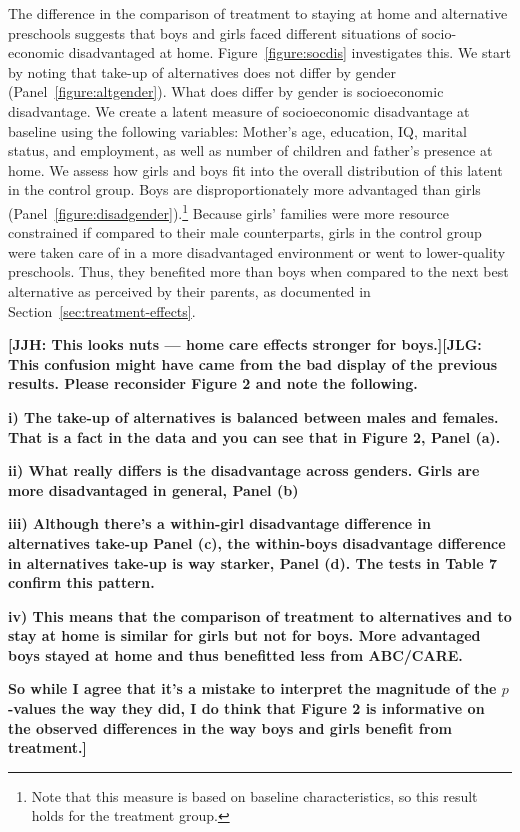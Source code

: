 The difference in the comparison of treatment to staying at home and alternative preschools suggests that boys and girls faced different situations of socio-economic disadvantaged at home. Figure~\ref{figure:socdis} investigates this. We start by noting that take-up of alternatives does not differ by gender (Panel~\ref{figure:altgender}). What does differ by gender is socioeconomic disadvantage. We create a latent measure of socioeconomic disadvantage at baseline using the following variables: Mother's age, education, IQ, marital status, and employment, as well as number of children and father's presence at home. We assess how girls and boys fit into the overall distribution of this latent in the control group. Boys are disproportionately more advantaged than girls (Panel~\ref{figure:disadgender}).\footnote{Note that this measure is based on baseline characteristics, so this result holds for the treatment group.} Because girls' families were more resource constrained if compared to their male counterparts, girls in the control group were taken care of in a more disadvantaged environment or went to lower-quality preschools. Thus, they benefited more than boys when compared to the next best alternative as perceived by their parents, as documented in Section~\ref{sec:treatment-effects}.

 \textbf{[JJH: This looks nuts --- home care effects stronger for boys.][JLG: This confusion might have came from the bad display of the previous results. Please reconsider Figure 2 and note the following.}

 \textbf{i) The take-up of alternatives is balanced between males and females. That is a fact in the data and you can see that in Figure 2, Panel (a).}

 \textbf{ii) What really differs is the disadvantage across genders. Girls are more disadvantaged in general, Panel (b)}

 \textbf{iii) Although there's a within-girl disadvantage difference in alternatives take-up Panel (c), the within-boys disadvantage difference in alternatives take-up is way starker, Panel (d). The tests in Table 7 confirm this pattern.}

 \textbf{iv) This means that the comparison of treatment to alternatives and to stay at home is similar for girls but not for boys. More advantaged boys stayed at home and thus benefitted less from ABC/CARE.}

 \textbf{So while I agree that it's a mistake to interpret the magnitude of the $p$-values the way they did, I do think that Figure 2 is informative on the observed differences in the way boys and girls benefit from treatment.] } 


